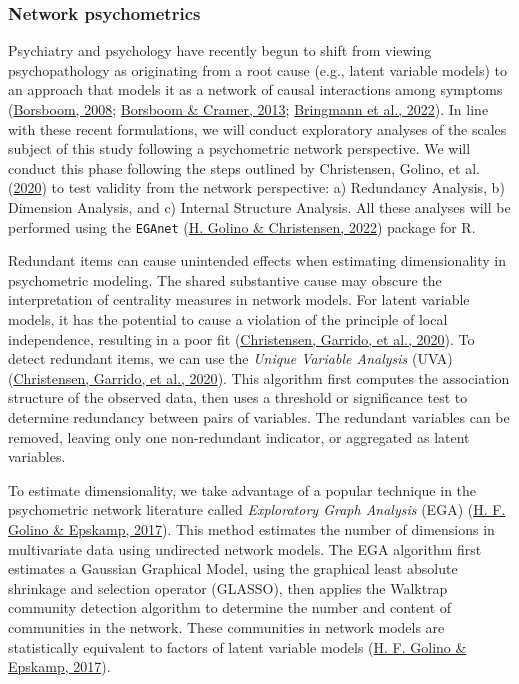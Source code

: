 \documentclass[
  ,doc,11pt, twoside,floatsintext]{apa6}
\begin{document}
\hypertarget{network-psychometrics}{%
\subsubsection{Network psychometrics}\label{network-psychometrics}}

Psychiatry and psychology have recently begun to shift from viewing psychopathology as originating from a root cause (e.g., latent variable models) to an approach that models it as a network of causal interactions among symptoms (\protect\hyperlink{ref-borsboom2008}{Borsboom, 2008}; \protect\hyperlink{ref-borsboom2013}{Borsboom \& Cramer, 2013}; \protect\hyperlink{ref-bringmann2022}{Bringmann et al., 2022}). In line with these recent formulations, we will conduct exploratory analyses of the scales subject of this study following a psychometric network perspective. We will conduct this phase following the steps outlined by Christensen, Golino, et al. (\protect\hyperlink{ref-christensen2020b}{2020}) to test validity from the network perspective: a) Redundancy Analysis, b) Dimension Analysis, and c) Internal Structure Analysis. All these analyses will be performed using the \texttt{EGAnet} (\protect\hyperlink{ref-EGAnet}{H. Golino \& Christensen, 2022}) package for R.

Redundant items can cause unintended effects when estimating dimensionality in psychometric modeling. The shared substantive cause may obscure the interpretation of centrality measures in network models. For latent variable models, it has the potential to cause a violation of the principle of local independence, resulting in a poor fit (\protect\hyperlink{ref-christensen2020a}{Christensen, Garrido, et al., 2020}). To detect redundant items, we can use the \emph{Unique Variable Analysis} (UVA) (\protect\hyperlink{ref-christensen2020a}{Christensen, Garrido, et al., 2020}). This algorithm first computes the association structure of the observed data, then uses a threshold or significance test to determine redundancy between pairs of variables. The redundant variables can be removed, leaving only one non-redundant indicator, or aggregated as latent variables.

To estimate dimensionality, we take advantage of a popular technique in the psychometric network literature called \emph{Exploratory Graph Analysis} (EGA) (\protect\hyperlink{ref-golino2017}{H. F. Golino \& Epskamp, 2017}). This method estimates the number of dimensions in multivariate data using undirected network models. The EGA algorithm first estimates a Gaussian Graphical Model, using the graphical least absolute shrinkage and selection operator (GLASSO), then applies the Walktrap community detection algorithm to determine the number and content of communities in the network. These communities in network models are statistically equivalent to factors of latent variable models (\protect\hyperlink{ref-golino2017}{H. F. Golino \& Epskamp, 2017}).
\end{document}
